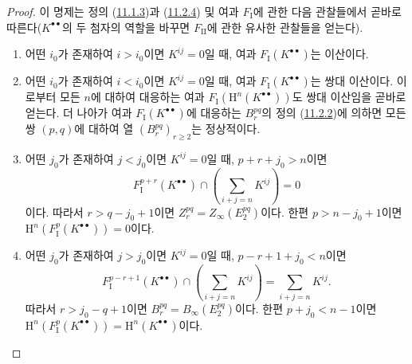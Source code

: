 \begin{proof}
이 명제는 정의 (\hyperref[0.11.1.3-fr]{11.1.3})과
(\hyperref[0.11.2.4-fr]{11.2.4}) 및 여과 $F_{\mathrm I}$에 관한 다음
관찰들에서 곧바로 따른다($K^{\bullet\bullet}$의 두 첨자의 역할을 바꾸면
$F_{\mathrm{II}}$에 관한 유사한 관찰들을 얻는다).
\begin{enumerate}
  \item[$1^\circ$] 어떤 $i_0$가 존재하여 $i>i_0$이면 $K^{ij}=0$일 때,
    여과 $F_{\mathrm I}(K^{\bullet\bullet})$는 이산이다.
  \item[$2^\circ$] 어떤 $i_0$가 존재하여 $i<i_0$이면 $K^{ij}=0$일 때,
    여과 $F_{\mathrm I}(K^{\bullet\bullet})$는 쌍대 이산이다. 이로부터 모든
    $n$에 대하여 대응하는 여과
    $F_{\mathrm I}(\mathrm H^n(K^{\bullet\bullet}))$도 쌍대 이산임을
    곧바로 얻는다. 더 나아가 여과
    $F_{\mathrm I}(K^{\bullet\bullet})$에 대응하는 $B_r^{pq}$의 정의
    (\hyperref[0.11.2.2-fr]{11.2.2})에 의하면 모든 쌍 $(p,q)$에 대하여
    열 $(B_r^{pq})_{r\geq2}$는 정상적이다.
  \item[$3^\circ$] 어떤 $j_0$가 존재하여 $j<j_0$이면 $K^{ij}=0$일 때,
    $p+r+j_0>n$이면
    \[
      F_{\mathrm I}^{p+r}(K^{\bullet\bullet})
      \cap\left(\sum_{i+j=n}K^{ij}\right)=0
    \]
    이다. 따라서 $r>q-j_0+1$이면
    $Z_r^{pq}=Z_\infty(E_2^{pq})$이다. 한편 $p>n-j_0+1$이면
    $\mathrm H^n(F_{\mathrm I}^p(K^{\bullet\bullet}))=0$이다.
  \item[$4^\circ$] 어떤 $j_0$가 존재하여 $j>j_0$이면 $K^{ij}=0$일 때,
    $p-r+1+j_0<n$이면
    \[
      F_{\mathrm I}^{p-r+1}(K^{\bullet\bullet})
      \cap\left(\sum_{i+j=n}K^{ij}\right)=\sum_{i+j=n}K^{ij}.
    \]
    따라서 $r>j_0-q+1$이면
    $B_r^{pq}=B_\infty(E_2^{pq})$이다. 한편 $p+j_0<n-1$이면
    $\mathrm H^n(F_{\mathrm I}^p(K^{\bullet\bullet}))
    =\mathrm H^n(K^{\bullet\bullet})$이다.
\end{enumerate}
\end{proof}

